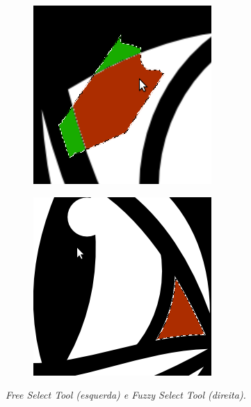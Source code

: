 \documentclass[12pt,onecolumn]{article}
\begin{document}
    \begin{figure}[ht]
      \centering
      \begin{subfigure}{.5\textwidth}
        \centering
        \includegraphics[width=.7\linewidth]{screenshots/02-free_select.png}
        \label{fig:free_select}
      \end{subfigure}%
      \begin{subfigure}{.5\textwidth}
        \centering
        \includegraphics[width=.7\linewidth]{screenshots/03-fuzzy_select.png}
        \label{fig:fuzzy_select}
      \end{subfigure}
      \caption{
        \footnotesize
        \it
        Free Select Tool (esquerda) e Fuzzy Select Tool (direita).
      }
      \label{fig:select_tools}
    \end{figure}
  
\end{document}
